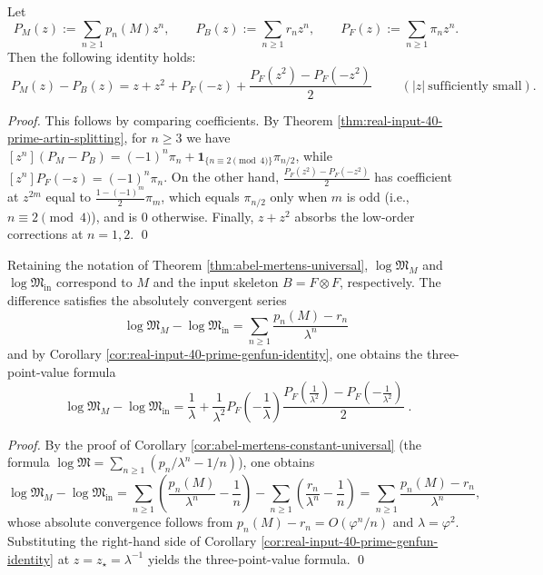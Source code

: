 \begin{corollary}\label{cor:real-input-40-prime-genfun-identity}
Let
\[
P_M(z):=\sum_{n\ge 1}p_n(M)z^n,\qquad
P_B(z):=\sum_{n\ge 1}r_n z^n,\qquad
P_F(z):=\sum_{n\ge 1}\pi_n z^n.
\]
Then the following identity holds:
\[
\boxed{\;
P_M(z)-P_B(z)= z+z^2+P_F(-z)+\frac{P_F(z^2)-P_F(-z^2)}{2}\;}
\qquad(|z|\ \text{sufficiently small}).
\]
\end{corollary}
\begin{proof}
This follows by comparing coefficients. By Theorem \ref{thm:real-input-40-prime-artin-splitting}, for \(n\ge 3\) we have
\(
[z^n](P_M-P_B)=(-1)^n\pi_n+\mathbf{1}_{\{n\equiv 2\pmod 4\}}\pi_{n/2}
\), while
\(
[z^n]P_F(-z)=(-1)^n\pi_n
\).
On the other hand,
\(
\frac{P_F(z^2)-P_F(-z^2)}{2}
\)
has coefficient at \(z^{2m}\) equal to \(\frac{1-(-1)^m}{2}\pi_m\), which equals \(\pi_{n/2}\) only when \(m\) is odd (i.e., \(n\equiv 2\pmod 4\)), and is \(0\) otherwise.
Finally, \(z+z^2\) absorbs the low-order corrections at \(n=1,2\). \qed
\end{proof}
\begin{corollary}\label{cor:real-input-40-logM-fast-prime}
Retaining the notation of Theorem \ref{thm:abel-mertens-universal}, \(\log\mathfrak{M}_M\) and \(\log\mathfrak{M}_{\mathrm{in}}\) correspond to \(M\) and the input skeleton \(B=F\otimes F\), respectively.
The difference satisfies the absolutely convergent series
\[
\boxed{\;
\log\mathfrak{M}_M-\log\mathfrak{M}_{\mathrm{in}}
=\sum_{n\ge 1}\frac{p_n(M)-r_n}{\lambda^n}\;}
\]
and by Corollary \ref{cor:real-input-40-prime-genfun-identity}, one obtains the three-point-value formula
\[
\boxed{\;
\log\mathfrak{M}_M-\log\mathfrak{M}_{\mathrm{in}}
=\frac{1}{\lambda}+\frac{1}{\lambda^2}
P_F\!\left(-\frac{1}{\lambda}\right)
\frac{
P_F\!\left(\frac{1}{\lambda^2}\right)-P_F\!\left(-\frac{1}{\lambda^2}\right)
}{2}\; }.
\]
\end{corollary}
\begin{proof}
By the proof of Corollary \ref{cor:abel-mertens-constant-universal} (the formula \(\log\mathfrak{M}=\sum_{n\ge 1}(p_n/\lambda^n-1/n)\)), one obtains
\[
\log\mathfrak{M}_M-\log\mathfrak{M}_{\mathrm{in}}
=\sum_{n\ge 1}\left(\frac{p_n(M)}{\lambda^n}-\frac{1}{n}\right)
-\sum_{n\ge 1}\left(\frac{r_n}{\lambda^n}-\frac{1}{n}\right)
=\sum_{n\ge 1}\frac{p_n(M)-r_n}{\lambda^n},
\]
whose absolute convergence follows from \(p_n(M)-r_n=O(\varphi^n/n)\) and \(\lambda=\varphi^2\).
Substituting the right-hand side of Corollary \ref{cor:real-input-40-prime-genfun-identity} at \(z=z_\star=\lambda^{-1}\) yields the three-point-value formula. \qed
\end{proof}

